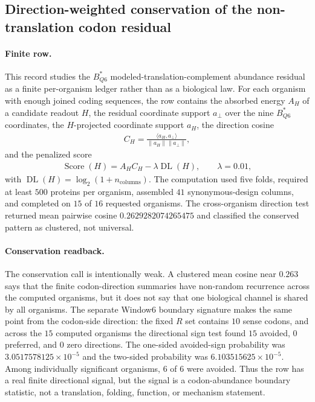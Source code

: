 
\subsection{Direction-weighted conservation of the non-translation codon residual}
\label{sec:bq6-direction-weighted-conservation}

\paragraph{Finite row.}
This record studies the $B^{*}_{Q6}$ modeled-translation-complement abundance residual as a finite per-organism ledger rather than as a biological law.  For each organism with enough joined coding sequences, the row contains the absorbed energy $A_H$ of a candidate readout $H$, the residual coordinate support $a_{\perp}$ over the nine $B^{*}_{Q6}$ coordinates, the $H$-projected coordinate support $a_H$, the direction cosine
$$
\begin{aligned}
C_H=\frac{\langle a_H,a_{\perp}\rangle}{\lVert a_H\rVert\lVert a_{\perp}\rVert},
\end{aligned}
$$
and the penalized score
$$
\begin{aligned}
\operatorname{Score}(H)=A_H C_H-\lambda\operatorname{DL}(H),\qquad \lambda=0.01,
\end{aligned}
$$
with $\operatorname{DL}(H)=\log_2(1+n_{\mathrm{columns}})$.  The computation used five folds, required at least $500$ proteins per organism, assembled $41$ synonymous-design columns, and completed on $15$ of $16$ requested organisms.  The cross-organism direction test returned mean pairwise cosine $0.2629282074265475$ and classified the conserved pattern as clustered, not universal.

\paragraph{Conservation readback.}
The conservation call is intentionally weak.  A clustered mean cosine near $0.263$ says that the finite codon-direction summaries have non-random recurrence across the computed organisms, but it does not say that one biological channel is shared by all organisms.  The separate Window6 boundary signature makes the same point from the codon-side direction: the fixed $R$ set contains $10$ sense codons, and across the $15$ computed organisms the directional sign test found $15$ avoided, $0$ preferred, and $0$ zero directions.  The one-sided avoided-sign probability was $3.0517578125\times 10^{-5}$ and the two-sided probability was $6.103515625\times 10^{-5}$.  Among individually significant organisms, $6$ of $6$ were avoided.  Thus the row has a real finite directional signal, but the signal is a codon-abundance boundary statistic, not a translation, folding, function, or mechanism statement.


